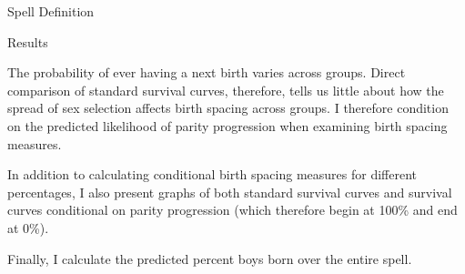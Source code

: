 \documentclass[final]{beamer}
\newlength{\twocolwid}
\begin{document}
\begin{frame}{}
\begin{columns}[t]
\begin{column}{\twocolwid}
\begin{block}{Spell Definition}
\end{block}

\begin{block}{Results}


The probability of ever having a next birth varies across groups.
Direct comparison of standard survival curves, therefore, tells us little 
about how the spread of sex selection affects birth spacing across groups.
I therefore condition on the predicted likelihood of parity 
progression when examining birth spacing measures.

In addition to calculating conditional birth spacing measures for different 
percentages, I also present graphs of both standard survival curves and
survival curves conditional on parity progression (which therefore
begin at 100\% and end at 0\%).

Finally, I calculate the predicted percent boys born over the entire spell.



\end{block}
\end{column}
\end{columns}
\end{frame}
\end{document}
